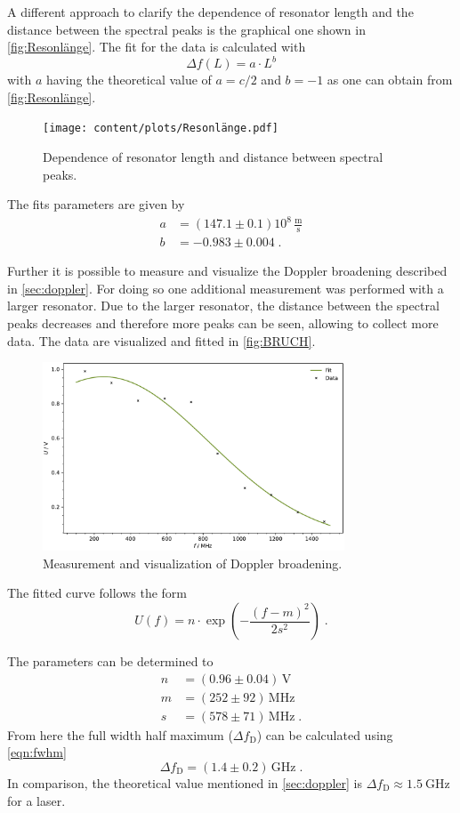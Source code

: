 A different approach to clarify the dependence of resonator length and the distance between the spectral peaks is the graphical one shown in \autoref{fig:Resonlänge}. The fit for the data is calculated with 
\begin{equation*}
    \Delta f(L)=a\cdot L^{b}
\end{equation*}
with $a$ having the theoretical value of $a=c/2$ and $b=-1$ as one can obtain from \autoref{fig:Resonlänge}.
\begin{figure}[h!]
    \centering
    \texttt{[image: content/plots/Resonlänge.pdf]}
    \caption{Dependence of resonator length and distance between spectral peaks.}
    \label{fig:Resonlänge}
\end{figure}
The fits parameters are given by 
\begin{align*}
    a&= (147.1 \pm 0.1) 10^8\, \frac{\text{m}}{\text{s}} \\
    b&= -0.983 \pm 0.004\; .
\end{align*}

Further it is possible to measure and visualize the Doppler broadening described in \autoref{sec:doppler}. For doing so one additional measurement was performed with a larger resonator. Due to the larger resonator, the distance between the spectral peaks decreases and therefore more peaks can be seen, allowing to collect more data. The data are visualized and fitted in \autoref{fig:BRUCH}.
\begin{figure}[h!]
    \centering
    \includegraphics[width=0.8\textwidth]{content/plots/AUA.pdf}
    \caption{Measurement and visualization of Doppler broadening.}
    \label{fig:BRUCH}
\end{figure}
The fitted curve follows the form 
\begin{equation*}
    U(f)= n\cdot \exp\left(-\frac{(f-m)^2}{2s^2}\right)\; .
\end{equation*}

The parameters can be determined to
\begin{align*}
    n &= (0.96 \pm 0.04)\, \text{V} \\
    m &= (252 \pm 92) \, \text{MHz} \\
    s &= (578 \pm 71) \, \text{MHz}\; .
\end{align*}
From here the full width half maximum ($\Delta f_{\text{D}}$) can be calculated using \eqref{eqn:fwhm}
\begin{equation*}
    \Delta f_{\text{D}} = (1.4 \pm 0.2) \, \text{GHz}\; . 
\end{equation*}
In comparison, the theoretical value mentioned in \autoref{sec:doppler} is $\Delta f_\text{D} \approx \qty{1.5}{\giga\hertz}$ for a \HeNe laser.
